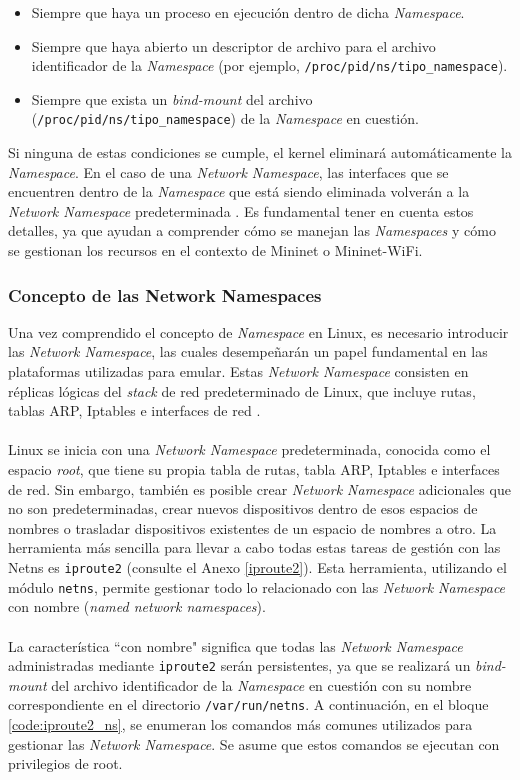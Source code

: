 \begin{itemize}
    \item Siempre que haya un proceso en ejecución dentro de dicha \textit{Namespace}.
    \item Siempre que haya abierto un descriptor de archivo para el archivo identificador de la \textit{Namespace} (por ejemplo, \texttt{/proc/{pid}/ns/{tipo\_namespace}}).
    \item Siempre que exista un \textit{bind-mount} del archivo (\texttt{/proc/{pid}/ns/{tipo\_namespace}}) de la \textit{Namespace} en cuestión.
\end{itemize}

Si ninguna de estas condiciones se cumple, el kernel eliminará automáticamente la \textit{Namespace}. En el caso de una \textit{Network Namespace}, las interfaces que se encuentren dentro de la \textit{Namespace} que está siendo eliminada volverán a la \textit{Network Namespace} predeterminada \cite{ns}. Es fundamental tener en cuenta estos detalles, ya que ayudan a comprender cómo se manejan las \textit{Namespaces} y cómo se gestionan los recursos en el contexto de Mininet o Mininet-WiFi.

\subsubsection{Concepto de las Network Namespaces}

Una vez comprendido el concepto de \textit{Namespace} en Linux, es necesario introducir las \textit{Network Namespace}, las cuales desempeñarán un papel fundamental en las plataformas utilizadas para emular. Estas \textit{Network Namespace} consisten en réplicas lógicas del \textit{stack} de red predeterminado de Linux, que incluye rutas, tablas ARP, Iptables e interfaces de red \cite{netns}.\\
\\
Linux se inicia con una \textit{Network Namespace} predeterminada, conocida como el espacio \textit{root}, que tiene su propia tabla de rutas, tabla ARP, Iptables e interfaces de red. Sin embargo, también es posible crear \textit{Network Namespace} adicionales que no son predeterminadas, crear nuevos dispositivos dentro de esos espacios de nombres o trasladar dispositivos existentes de un espacio de nombres a otro. La herramienta más sencilla para llevar a cabo todas estas tareas de gestión con las Netns es \texttt{iproute2} (consulte el Anexo \ref{iproute2}). Esta herramienta, utilizando el módulo \texttt{netns}, permite gestionar todo lo relacionado con las \textit{Network Namespace} con nombre (\textit{named network namespaces}). \\
\\
La característica ``con nombre" significa que todas las \textit{Network Namespace} administradas mediante \texttt{iproute2} serán persistentes, ya que se realizará un \textit{bind-mount} del archivo identificador de la \textit{Namespace} en cuestión con su nombre correspondiente en el directorio \texttt{/var/run/netns}. A continuación, en el bloque \ref{code:iproute2_ns}, se enumeran los comandos más comunes utilizados para gestionar las \textit{Network Namespace}. Se asume que estos comandos se ejecutan con privilegios de root.\\

